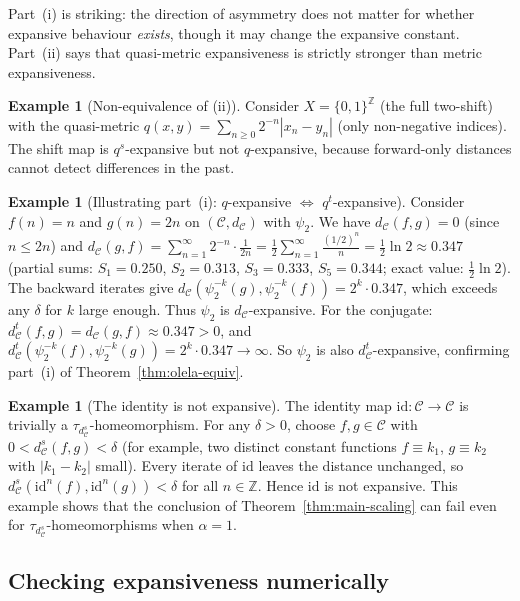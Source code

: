 \documentclass[11pt,a4paper]{article}
\theoremstyle{plain}
\theoremstyle{definition}
\newtheorem{exampleinner}[theoreminner]{Example}
\newenvironment{example}[1][]{\begin{exampleinner}[#1]}{\end{exampleinner}}
\newcommand{\Z}{\mathbb{Z}}
\newcommand{\C}{\mathcal{C}}
\begin{document}
Part~(i) is striking: the direction of asymmetry does not matter
for whether expansive behaviour \emph{exists}, though it may
change the expansive constant.  Part~(ii) says that quasi-metric
expansiveness is strictly stronger than metric expansiveness.

\begin{example}[Non-equivalence of (ii)]
\label{ex:converse-false}
Consider $X=\{0,1\}^\Z$ (the full two-shift) with the quasi-metric
$q(x,y)=\sum_{n\ge 0}2^{-n}|x_n-y_n|$ (only non-negative indices).
The shift map is $q^s$-expansive but not $q$-expansive, because
forward-only distances cannot detect differences in the past.
\end{example}

\begin{example}[Illustrating part~(i): $q$-expansive $\Leftrightarrow$ $q^t$-expansive]
\label{ex:q-qt-equiv}
Consider $f(n)=n$ and $g(n)=2n$ on $(\C,d_\C)$ with $\psi_2$.
We have $d_\C(f,g)=0$ (since $n\le 2n$) and
$d_\C(g,f)=\sum_{n=1}^\infty 2^{-n}\cdot\frac{1}{2n}
=\frac{1}{2}\sum_{n=1}^\infty\frac{(1/2)^n}{n}=\frac{1}{2}\ln 2
\approx 0.347$
(partial sums: $S_1=0.250$, $S_2=0.313$, $S_3=0.333$,
$S_5=0.344$; exact value: $\frac{1}{2}\ln 2$).
The backward iterates give $d_\C(\psi_2^{-k}(g),\psi_2^{-k}(f))
=2^k\cdot 0.347$, which exceeds any $\delta$ for $k$ large enough.
Thus $\psi_2$ is $d_\C$-expansive.  For the conjugate:
$d_\C^t(f,g)=d_\C(g,f)\approx 0.347>0$, and
$d_\C^t(\psi_2^{-k}(f),\psi_2^{-k}(g))=2^k\cdot 0.347\to\infty$.
So $\psi_2$ is also $d_\C^t$-expansive, confirming part~(i) of
Theorem~\ref{thm:olela-equiv}.
\end{example}

\begin{example}[The identity is not expansive]\label{ex:non-expansive}
The identity map $\mathrm{id}\colon\C\to\C$ is trivially a
$\tau_{d_\C^s}$-homeomorphism.  For any $\delta>0$, choose
$f,g\in\C$ with $0<d_\C^s(f,g)<\delta$ (for example, two distinct
constant functions $f\equiv k_1$, $g\equiv k_2$ with $|k_1-k_2|$
small).  Every iterate of $\mathrm{id}$ leaves the distance
unchanged, so $d_\C^s(\mathrm{id}^n(f),\mathrm{id}^n(g))<\delta$
for all $n\in\Z$.  Hence $\mathrm{id}$ is not expansive.  This
example shows that the conclusion of
Theorem~\ref{thm:main-scaling} can fail even for
$\tau_{d_\C^s}$-homeomorphisms when $\alpha=1$.
\end{example}

\subsection{Checking expansiveness numerically}
\end{document}
